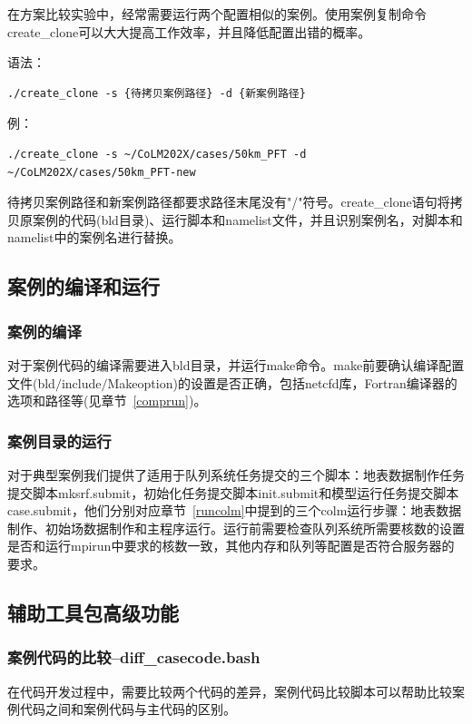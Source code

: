 \documentclass[a4paper,12pt,twoside]{article}
\begin{document}
在方案比较实验中，经常需要运行两个配置相似的案例。使用案例复制命令create\_clone可以大大提高工作效率，并且降低配置出错的概率。

语法：
\begin{lstlisting}
./create_clone -s {待拷贝案例路径} -d {新案例路径}  
\end{lstlisting}

例：
\begin{lstlisting}
./create_clone -s ~/CoLM202X/cases/50km_PFT -d ~/CoLM202X/cases/50km_PFT-new  
\end{lstlisting}

待拷贝案例路径和新案例路径都要求路径末尾没有"/"符号。create\_clone语句将拷贝原案例的代码(bld目录)、运行脚本和namelist文件，并且识别案例名，对脚本和namelist中的案例名进行替换。

\subsection{案例的编译和运行}
\subsubsection{案例的编译}
对于案例代码的编译需要进入bld目录，并运行make命令。make前要确认编译配置文件(bld$\slash$include$\slash$Makeoption)的设置是否正确，包括netcfd库，Fortran编译器的选项和路径等(见章节~\ref{comprun})。

\subsubsection{案例目录的运行}
对于典型案例我们提供了适用于队列系统任务提交的三个脚本：地表数据制作任务提交脚本mksrf.submit，初始化任务提交脚本init.submit和模型运行任务提交脚本case.submit，他们分别对应章节~\ref{runcolm}中提到的三个colm运行步骤：地表数据制作、初始场数据制作和主程序运行。运行前需要检查队列系统所需要核数的设置是否和运行mpirun中要求的核数一致，其他内存和队列等配置是否符合服务器的要求。

\subsection{辅助工具包高级功能}

\subsubsection{案例代码的比较--diff\_casecode.bash}

在代码开发过程中，需要比较两个代码的差异，案例代码比较脚本可以帮助比较案例代码之间和案例代码与主代码的区别。
\end{document}
